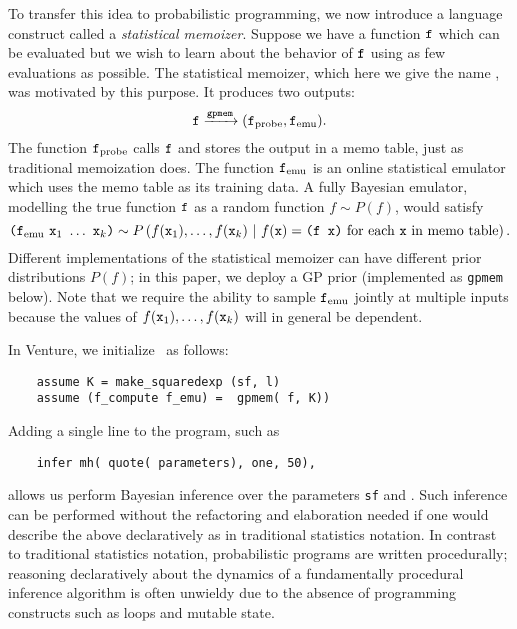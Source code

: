 To transfer this idea to probabilistic programming, we now introduce a language construct called a
\emph{statistical memoizer}.  Suppose we have a function $\texttt{f}$ which can be evaluated 
but we wish to learn about the behavior of $\texttt{f}$ using as
few evaluations as possible.  The statistical memoizer, which here we give the
name \gpmem, was motivated by this purpose.  It produces two outputs:
\[ \texttt{f} \xrightarrow{\texttt{gpmem}} (\texttt{f}_{\textrm{probe}}, \texttt{f}_{\textrm{emu}}). \]
The function $\texttt{f}_{\textrm{probe}}$ calls $\texttt{f}$ and stores the output in a memo
table, just as traditional memoization does.  The function $\texttt{f}_{\textrm{emu}}$ is
an online statistical emulator which uses the memo table as its training
data.  A fully Bayesian emulator, modelling the true function $\texttt{f}$ as a
random function $f \sim P(f)$, would satisfy
\[
\texttt{(}\ftt_\emu\ \xtt_1\ \ldots\ \xtt_k\texttt{)}
\sim
P\pn{
  f(\xtt_1), \ldots, f(\xtt_k)
  \mvert
  \text{$f(\xtt) = \texttt{(f x)}$ for each $\xtt$ in memo table}
}.
\]
Different implementations of the statistical memoizer can have
different prior distributions $P(f)$; in this paper, we deploy a \ac{GP} 
prior (implemented as \texttt{gpmem} below).  Note that we require the ability
to sample $\texttt{f}_{\textrm{emu}}$ jointly at multiple inputs because the values of
$f(\texttt{x}_1),\ldots,f(\texttt{x}_k)$ will in general be dependent.

In Venture, we initialize \gpmem\ as follows:

    \begin{lstlisting}
    assume K = make_squaredexp (sf, l)
    assume (f_compute f_emu) =  gpmem( f, K))
    \end{lstlisting}



Adding a single line to the program, such as
    \begin{lstlisting}
    infer mh( quote( parameters), one, 50),
    \end{lstlisting}
allows us perform Bayesian inference over the parameters \texttt{sf} and . 
Such inference can be performed without the refactoring and elaboration needed if one
would describe the above declaratively as in traditional statistics notation. 
In contrast to traditional statistics notation, probabilistic programs are written
procedurally; reasoning declaratively about the dynamics of a fundamentally procedural inference
algorithm is often unwieldy due to the absence of programming constructs
such as loops and mutable state.

